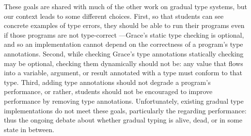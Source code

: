 These goals are shared with much of the other work on gradual type
systems, but our context leads to some different choices. First, so
that students can see concrete examples of type errors, they should be
able to run their programs even if those programs are not type-correct%
---\ie Grace's static type checking is optional, and so an
implementation cannot depend on the correctness of a program's type
annotations. Second, while checking Grace's type annotations
statically checking may be optional, checking them dynamically should
not be: any value that flows into a variable, argument, or result
annotated with a type must conform to that type.  Third, adding type
annotations should not degrade a program's performance, or rather,
students should not be encouraged to improve performance by removing
type annotations.  Unfortunately, existing gradual type
implementations do not meet these goals, particularly the regarding
performance: thus the ongoing debate about whether gradual typing is
alive, dead, or in some state in
between\citep{Takikawa2016,Vitousek2017,Muehlboeck2017,Bauman2017,Richards2017,Greenman2018}.





